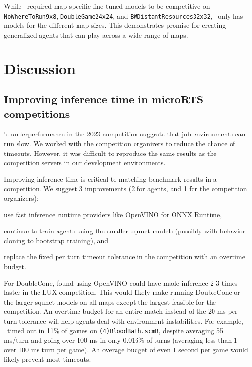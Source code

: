 \documentclass[conference]{IEEEtran}
\begin{document}
While \agentName\ required map-specific fine-tuned models to be competitive on
\texttt{NoWhereToRun9x8}, \texttt{DoubleGame24x24}, and \texttt{BWDistantResources32x32},
\bcPPOAgent\ only has models for the different map-sizes. This demonstrates promise for
creating generalized agents that can play across a wide range of maps.

\section{Discussion}
\subsection{Improving inference time in microRTS competitions}
\agentName's underperformance in the 2023 competition suggests that job
environments can run slow. We worked with the competition
organizers to reduce the chance of timeouts. However, it was difficult to reproduce the same results as
the competition servers in our development environments.

Improving inference time is critical to matching benchmark results in a competition.
We suggest 3 improvements (2 for agents, and 1 for the competition organizers):
\begin{inparaenum}[(1)]
    \item use fast inference runtime providers like OpenVINO for ONNX Runtime,
    \item continue to train agents using the smaller squnet models (possibly with
    behavior cloning to bootstrap training), and
    \item replace the fixed per turn timeout tolerance in the competition with an overtime
    budget.
\end{inparaenum}
For DoubleCone, \cite{Ferdinand2021doublecone} found using OpenVINO could have made
inference 2-3 times faster in the LUX competition. This  would likely
make running DoubleCone or the larger squnet models on all maps except the largest
feasible for the competition. An overtime budget for an entire match instead of the 20 ms
per turn tolerance will help agents deal with environment instabilities. For example,
\bcPPOAgent\ timed out in 11\% of games on \texttt{(4)BloodBath.scmB}, despite averaging
55 ms/turn and going over 100 ms in only 0.016\% of turns (averaging less than 1 over
100 ms turn per game). An overage budget of even 1 second per game would likely prevent
most timeouts.
\end{document}
